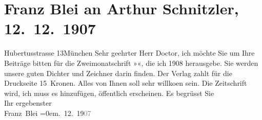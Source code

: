 

               \section[Franz Blei an Arthur Schnitzler, 12. 12. 1907]{ Franz Blei an Arthur Schnitzler, 12. 12. 1907}\nopagebreak{}\rehead{ }\begin{ledgroupsized}[t]{13cm}\normalsize\beginnumbering{} \toendnotes[C]{\smallbreak\pagebreak[2]} 
\toendnotes[C]{\smallbreak}\pstart
           \noindent{}{\pb}Hubertusstrasse{ }13\hspace*{1.5em}München\pend
           \pstart{}Sehr geehrter Herr Doctor,\pend\pstart
           ich möchte Sie um Ihre Beiträge bitten für die Zweimonatschrift »\label{K_L01740_1v}\label{K_L01740_1h}«, die ich 1908
                    herausgebe. Sie werden unsere guten Dichter und Zeichner darin finden. Der
                    Verlag zahlt für die Druckseite 15 Kronen. Alles von Ihnen soll sehr willko{\geminationm}en sein. Die Zeitschrift wird, ich muss es
                    hinzufügen, öffentlich erscheinen.\pend
           \pstart
           Es begrüsst Sie{\\[\baselineskip]}Ihr ergebenster{\\[\baselineskip]}\spacefill\mbox{Franz Blei}\pend
           \leftskip=0em{}. 12. 19\textcolor{gray}{07}\pend
                     \endnumbering{}\end{ledgroupsized}  \newcommand{\dateiname}{L01740}\newcommand{\titel}{Franz Blei an Arthur Schnitzler, 12. 12. 1907}\newcommand{\editorInnen}{Martin Anton Müller und Gerd-Hermann Susen}
            \footnotesize
\begin{ledgroupsized}[t]{11.5cm}
\end{ledgroupsized}
         
      